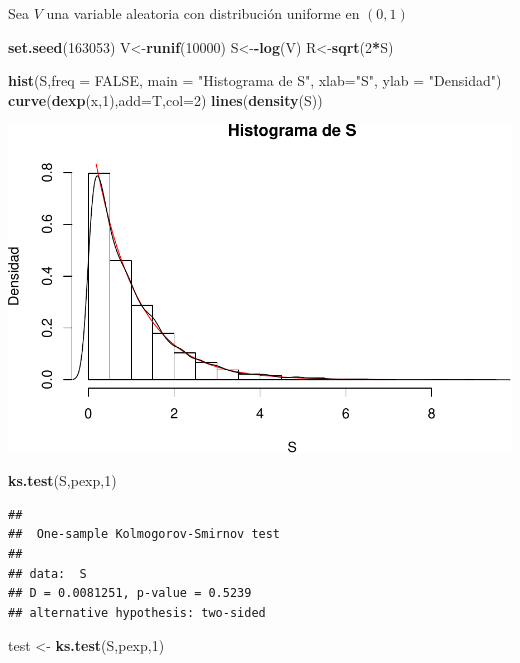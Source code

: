 \documentclass[]{article}
\newenvironment{Shaded}{\begin{snugshade}}{\end{snugshade}}
\newcommand{\KeywordTok}[1]{\textcolor[rgb]{0.13,0.29,0.53}{\textbf{#1}}}
\newcommand{\DataTypeTok}[1]{\textcolor[rgb]{0.13,0.29,0.53}{#1}}
\newcommand{\DecValTok}[1]{\textcolor[rgb]{0.00,0.00,0.81}{#1}}
\newcommand{\StringTok}[1]{\textcolor[rgb]{0.31,0.60,0.02}{#1}}
\newcommand{\OtherTok}[1]{\textcolor[rgb]{0.56,0.35,0.01}{#1}}
\newcommand{\OperatorTok}[1]{\textcolor[rgb]{0.81,0.36,0.00}{\textbf{#1}}}
\newcommand{\NormalTok}[1]{#1}
\begin{document}
Sea \(V\) una variable aleatoria con distribución uniforme en \((0,1)\)

\begin{Shaded}
\begin{Highlighting}[]
\KeywordTok{set.seed}\NormalTok{(}\DecValTok{163053}\NormalTok{)}
\NormalTok{V<-}\KeywordTok{runif}\NormalTok{(}\DecValTok{10000}\NormalTok{)}
\NormalTok{S<-}\OperatorTok{-}\KeywordTok{log}\NormalTok{(V)}
\NormalTok{R<-}\KeywordTok{sqrt}\NormalTok{(}\DecValTok{2}\OperatorTok{*}\NormalTok{S)}

\KeywordTok{hist}\NormalTok{(S,}\DataTypeTok{freq =} \OtherTok{FALSE}\NormalTok{, }\DataTypeTok{main =} \StringTok{"Histograma de S"}\NormalTok{, }\DataTypeTok{xlab=}\StringTok{"S"}\NormalTok{, }\DataTypeTok{ylab =} \StringTok{"Densidad"}\NormalTok{)}
\KeywordTok{curve}\NormalTok{(}\KeywordTok{dexp}\NormalTok{(x,}\DecValTok{1}\NormalTok{),}\DataTypeTok{add=}\NormalTok{T,}\DataTypeTok{col=}\DecValTok{2}\NormalTok{)}
\KeywordTok{lines}\NormalTok{(}\KeywordTok{density}\NormalTok{(S))}
\end{Highlighting}
\end{Shaded}

\includegraphics[width=0.63\linewidth]{notebook_simulaciones_files/figure-latex/unnamed-chunk-10-1}

\begin{Shaded}
\begin{Highlighting}[]
\KeywordTok{ks.test}\NormalTok{(S,pexp,}\DecValTok{1}\NormalTok{)}
\end{Highlighting}
\end{Shaded}

\begin{verbatim}
## 
##  One-sample Kolmogorov-Smirnov test
## 
## data:  S
## D = 0.0081251, p-value = 0.5239
## alternative hypothesis: two-sided
\end{verbatim}

\begin{Shaded}
\begin{Highlighting}[]
\NormalTok{test <-}\StringTok{ }\KeywordTok{ks.test}\NormalTok{(S,pexp,}\DecValTok{1}\NormalTok{)}
\end{Highlighting}
\end{Shaded}
\end{document}
